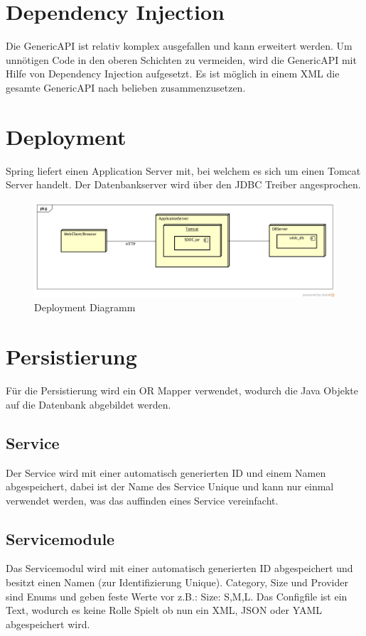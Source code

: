\section{Dependency Injection}

Die GenericAPI ist relativ komplex ausgefallen und kann erweitert werden. Um unnötigen 
Code in den oberen Schichten zu vermeiden, wird die GenericAPI mit Hilfe von Dependency
 Injection aufgesetzt. Es ist möglich in einem XML die gesamte GenericAPI nach belieben zusammenzusetzen.

\section{Deployment}

Spring liefert einen Application Server mit, bei welchem es sich um einen Tomcat 
Server handelt. Der Datenbankserver wird über den JDBC Treiber angesprochen.

\begin{figure}[!htbp]
\includegraphics[width=\textwidth]{./05_Design/04_Architektur/deployment}
\caption{Deployment Diagramm}
\end{figure}

\section{Persistierung}
Für die Persistierung wird ein OR Mapper verwendet, wodurch die Java 
Objekte auf die Datenbank abgebildet werden.

\subsection{Service}
Der Service wird mit einer automatisch generierten ID und einem Namen 
abgespeichert, dabei ist der Name des Service Unique und kann nur einmal 
verwendet werden, was das auffinden eines Service vereinfacht.

\subsection{Servicemodule}
Das Servicemodul wird mit einer automatisch generierten ID abgespeichert und besitzt einen 
Namen (zur Identifizierung Unique).
Category, Size und Provider sind Enums und geben feste Werte vor z.B.: Size: 
S,M,L.
Das Configfile ist ein Text, wodurch es keine Rolle Spielt ob nun ein \ac{XML}, \ac{JSON} 
oder \ac{YAML} abgespeichert wird.

